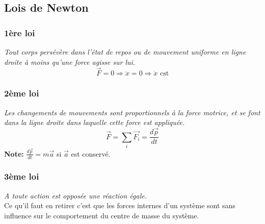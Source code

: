 

    \subsection{Lois de Newton}

    \subsubsection*{1ère loi} \textit{Tout corps persévère dans l'état de repos ou de mouvement uniforme en ligne droite à moins qu'une force agisse sur lui.}
    \[ \vec{F} = 0 \Rightarrow \ddot{x} = 0 \Rightarrow \dot{x} \text{ cst} \]
    
    \subsubsection*{2ème loi} \textit{Les changements de mouvements sont proportionnels à la force motrice, et se font dans la ligne droite dans laquelle cette force est appliquée.}
    \[ \vec{F} = \sum_i \vec{F_i} = \frac{d\vec{p}}{dt }\]
    \textbf{Note: } $\frac{d\vec{p}}{dt} = m\vec{a}$ si $\vec{a}$ est conservé.
    \subsubsection*{3ème loi} \textit{A toute action est opposée une réaction égale.}
    \\
    Ce qu'il faut en retirer c'est que les forces internes d'un système sont sans influence sur le comportement du centre de masse du système.
    
    
    \newpage